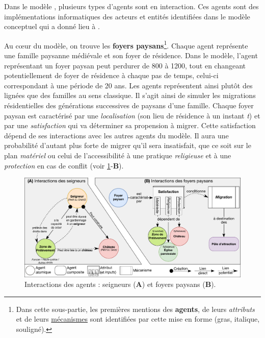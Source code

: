Dans le modèle \simfeodal{}, plusieurs types d'agents sont en interaction. Ces agents sont des implémentations informatiques des acteurs et entités identifiées dans le modèle conceptuel qui a donné lieu à \simfeodal{} \autocite[voir][Tableau 1, \ppno~309--310]{cura_transition_2017}.

 Au cœur du modèle, on trouve les \textbf{foyers paysans}\footnote{
	Dans cette sous-partie, les premières mentions des \textbf{agents}, de leurs \textit{attributs} et de leurs \ul{mécanismes} sont identifiées par cette mise en forme (gras, italique, souligné).
}.
Chaque agent représente une famille paysanne médiévale et son foyer de résidence.
Dans le modèle, l'agent représentant un foyer paysan peut perdurer de 800 à 1200, tout en changeant potentiellement de foyer de résidence à chaque pas de temps, celui-ci correspondant à une période de 20 ans.
Les agents représentent ainsi plutôt des lignées que des familles au sens classique.
Il s'agit ainsi de simuler les migrations résidentielles des générations successives de paysans d'une famille.
Chaque foyer paysan est caractérisé par une \textit{localisation} (son lieu de résidence à un instant \textit{t}) et par une \textit{satisfaction} qui va déterminer sa propension à migrer.
Cette satisfaction dépend de ses interactions avec les autres agents du modèle.
Il aura une probabilité d'autant plus forte de migrer qu'il sera insatisfait, que ce soit sur le plan \textit{matériel} ou celui de l'accessibilité à une pratique \textit{religieuse} et à une \textit{protection} en cas de conflit (voir \cref{fig:interactions-agents}-\textbf{B}).

\begin{figure}[H]
	\centering
	\includegraphics[width=\linewidth]{img/agents_interactions.pdf}
	\caption[Interactions des agents : seigneurs et foyers paysans.]{Interactions des agents : seigneurs (\textbf{A}) et foyers paysans (\textbf{B}).}
	\label{fig:interactions-agents}
\end{figure}
\clearpage

